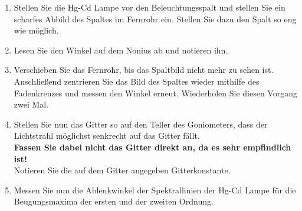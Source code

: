 %
\begin{enumerate}
	\item Stellen Sie die Hg-Cd Lampe vor den Beleuchtungsspalt und stellen Sie ein scharfes Abbild des Spaltes im Fernrohr ein. Stellen Sie dazu den Spalt so eng wie möglich.
	\item Lesen Sie den Winkel auf dem Nonius ab und notieren ihn. 
	\item Verschieben Sie das Fernrohr, bis das Spaltbild nicht mehr zu sehen ist. Anschließend zentrieren Sie das Bild des Spaltes wieder mithilfe des Fadenkreuzes und messen den Winkel erneut. Wiederholen Sie diesen Vorgang zwei Mal.
	\item Stellen Sie nun das Gitter so auf den Teller des Goniometers, dass der Lichtstrahl möglichst senkrecht auf das Gitter fällt. \\
	\textbf{Fassen Sie dabei nicht das Gitter direkt an, da es sehr empfindlich ist!}\\
	Notieren Sie die auf dem Gitter angegeben Gitterkonstante.
	\item Messen Sie nun die Ablenkwinkel der Spektrallinien der Hg-Cd Lampe für die Beugungsmaxima der ersten  und der zweiten Ordnung. 
\end{enumerate}

